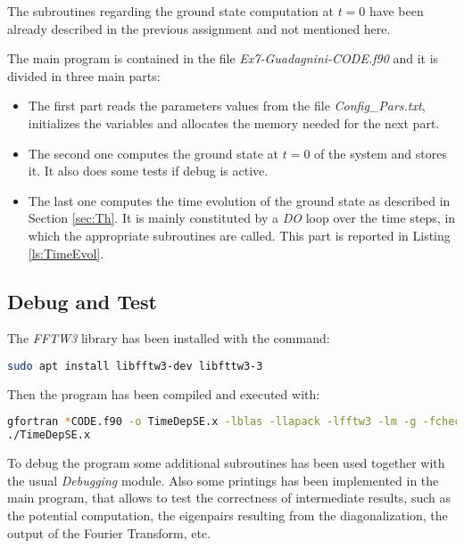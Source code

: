 \documentclass[11pt,a4paper]{article}
\begin{document}


The subroutines regarding the ground state computation at $t=0$ have been already described in the previous assignment and not mentioned here.

The main program is contained in the file \textit{Ex7-Guadagnini-CODE.f90} and it is divided in three main parts:
\begin{itemize}
	\item The first part reads the parameters values from the file \textit{Config\_Pars.txt}, initializes the variables and allocates the memory needed for the next part.
	\item The second one computes the ground state at $t=0$ of the system and stores it. It also does some tests if debug is active.
	\item The last one computes the time evolution of the ground state as described in Section \ref{sec:Th}. It is mainly constituted by a \textit{DO} loop over the time steps, in which the appropriate subroutines are called. This part is reported in Listing \ref{ls:TimeEvol}. 
\end{itemize}



\subsection{Debug and Test}
The \textit{FFTW3} library has been installed with the command:
\begin{lstlisting}[language=BASH,numbers=none]
sudo apt install libfftw3-dev libfttw3-3
\end{lstlisting}
Then the program has been compiled and executed with:
\begin{lstlisting}[language=BASH,]
gfortran *CODE.f90 -o TimeDepSE.x -lblas -llapack -lfftw3 -lm -g -fcheck=all -Wall -Wconversion-extra
./TimeDepSE.x
\end{lstlisting}

To debug the program some additional subroutines has been used together with the usual \textit{Debugging} module.
Also some printings has been implemented in the main program, that allows to test the correctness of intermediate results, such as the potential computation, the eigenpairs resulting from the diagonalization, the output of the Fourier Transform, etc.
\end{document}
